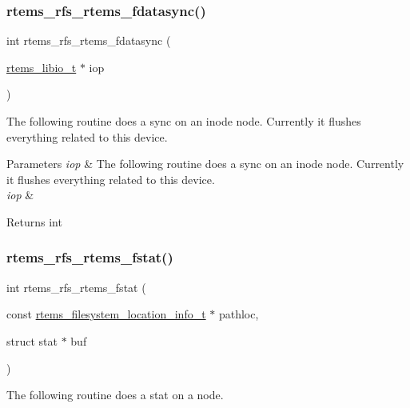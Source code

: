 \subsubsection{\texorpdfstring{rtems\_rfs\_rtems\_fdatasync()}{rtems\_rfs\_rtems\_fdatasync()}}
{\footnotesize\ttfamily int rtems\+\_\+rfs\+\_\+rtems\+\_\+fdatasync (\begin{DoxyParamCaption}\item[{\mbox{\hyperlink{structrtems__libio__tt}{rtems\+\_\+libio\+\_\+t}} $\ast$}]{iop }\end{DoxyParamCaption})}

The following routine does a sync on an inode node. Currently it flushes everything related to this device.


\begin{DoxyParams}{Parameters}
{\em iop} & The following routine does a sync on an inode node. Currently it flushes everything related to this device.\\
\hline
{\em iop} & \\
\hline
\end{DoxyParams}
\begin{DoxyReturn}{Returns}
int 
\end{DoxyReturn}
\mbox{\label{rtems-rfs-rtems_8h_a0ceaa395fe3f5ea0c01383618faa3b5c}} 
\subsubsection{\texorpdfstring{rtems\_rfs\_rtems\_fstat()}{rtems\_rfs\_rtems\_fstat()}}
{\footnotesize\ttfamily int rtems\+\_\+rfs\+\_\+rtems\+\_\+fstat (\begin{DoxyParamCaption}\item[{const \mbox{\hyperlink{group__LibIO_ga3252b3d31ee3c49ffff0b7604a676864}{rtems\+\_\+filesystem\+\_\+location\+\_\+info\+\_\+t}} $\ast$}]{pathloc,  }\item[{struct stat $\ast$}]{buf }\end{DoxyParamCaption})}

The following routine does a stat on a node. \mbox{\label{rtems-rfs-rtems_8h_a1ed03f3bced418219d0c658d8dce5e7a}} 
